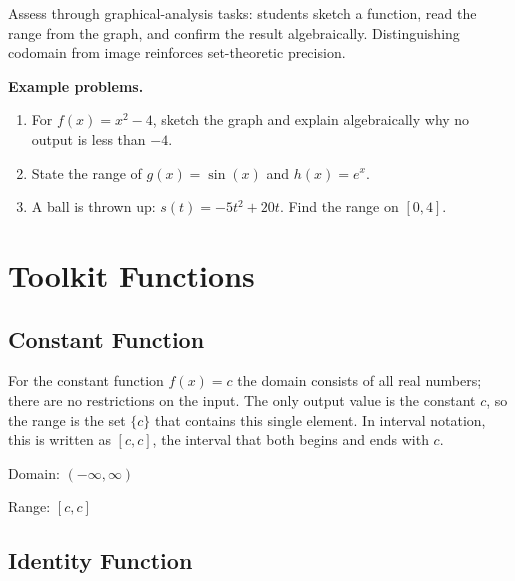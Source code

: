 Assess through graphical-analysis tasks: students sketch a function, read
the range from the graph, and confirm the result algebraically.
Distinguishing codomain from image reinforces set-theoretic precision.

\textbf{Example problems.}
\begin{enumerate}
    \item For $f(x)=x^2-4$, sketch the graph and explain algebraically
          why no output is less than $-4$.
    \item State the range of $g(x)=\sin(x)$ and $h(x)=e^x$.
    \item A ball is thrown up: $s(t)=-5t^2+20t$. Find the range on
          $[0,4]$.
\end{enumerate}



\section{Toolkit Functions}
\label{sec:tool-4c3a}



\subsection{Constant Function}
\label{sss:cons-6354}







For the constant function $f(x) = c$ the domain consists of all real numbers; there are no
restrictions on the input. The only output value is the constant $c$, so the range is the
set $\{c\}$ that contains this single element. In interval notation, this is written as
$[c,c]$, the interval that both begins and ends with $c$.



Domain: $( -\infty ,\infty )$



Range: $[c, c]$




\subsection{Identity Function}
\label{sss:iden-48e9}




